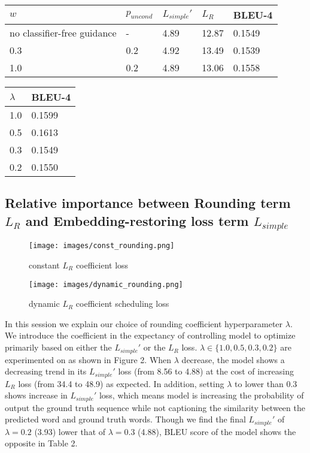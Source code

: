 \documentclass{article}
\begin{document}
\begin{minipage}[c]{0.5\textwidth}
\centering
\begin{tabular}{lllll}
\toprule
$w$ & $p_{uncond}$ & $L_{simple}'$ & $L_R$ & BLEU-4 \\
\midrule
no classifier-free guidance & - & 4.89 & 12.87 & 0.1549 \\
0.3 & 0.2 & 4.92 & 13.49 & 0.1539 \\
1.0 & 0.2 & 4.89 & 13.06 & 0.1558
\bottomrule
\end{tabular}
\label{tab:table1}
\end{minipage}
\begin{minipage}[c]{0.5\textwidth}
\centering
\begin{tabular}{ll}
\toprule
$\lambda$     & BLEU-4 \\
\midrule
1.0     & 0.1599 \\
0.5     & 0.1613 \\
0.3     & 0.1549 \\
0.2     & 0.1550
\bottomrule
\end{tabular}
\label{tab:const-lambda}
\end{minipage}


\subsection{Relative importance between Rounding term $L_R$ and Embedding-restoring loss term $L_{simple}$}
\label{sec:lambda-exp}
\begin{figure}
  \centering
  \texttt{[image: images/const\_rounding.png]}
  \caption{constant $L_R$ coefficient loss}
  \label{fig:const-lambda}
\end{figure}

\begin{figure}
  \centering
  \texttt{[image: images/dynamic\_rounding.png]}
  \caption{dynamic $L_R$ coefficient scheduling loss}
  \label{fig:dynamic-lambda}
\end{figure}

In this session we explain our choice of rounding coefficient hyperparameter $\lambda$. We introduce the coefficient in the expectancy of controlling model to optimize primarily based on either the $L_{simple}'$ or the $L_R$ loss. $\lambda \in \{1.0, 0.5, 0.3, 0.2\}$ are experimented on as shown in Figure 2. When $\lambda$ decrease, the model shows a decreasing trend in its $L_{simple}'$ loss (from 8.56 to 4.88) at the cost of increasing $L_R$ loss (from 34.4 to 48.9) as expected. In addition, setting $\lambda$ to lower than 0.3 shows increase in $L_{simple}'$ loss, which means model is increasing the probability of output the ground truth sequence while not captioning the similarity between the predicted word and ground truth words. Though we find the final $L_{simple}'$ of $\lambda = 0.2$ (3.93) lower that of $\lambda = 0.3$ (4.88), BLEU score of the model shows the opposite in Table 2. 
\end{document}
